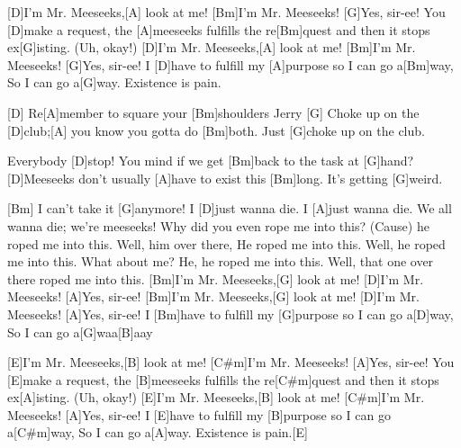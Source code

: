 

\begin{guitar}
	[D]I'm Mr. Meeseeks,[A] look at me! [Bm]I'm Mr. Meeseeks! [G]Yes, sir-ee!
	You [D]make a request, the [A]meeseeks fulfills the re[Bm]quest and then it stops ex[G]isting. (Uh, okay!)
	[D]I'm Mr. Meeseeks,[A] look at me! [Bm]I'm Mr. Meeseeks! [G]Yes, sir-ee!
	I [D]have to fulfill my [A]purpose so I can go a[Bm]way,
	So I can go a[G]way. Existence is pain.
	
	[D] Re[A]member to square your [Bm]shoulders Jerry [G]{}
	Choke up on the [D]club;[A] you know you gotta do [Bm]both. Just [G]choke up on the club.
	
	 
	
	Everybody [D]stop! You mind if we get [Bm]back to the task at [G]hand? 
	[D]Meeseeks don't usually [A]have to exist this [Bm]long. It's getting [G]weird.
	
	 
	
	[Bm] I can't take it [G]anymore!
	I [D]just wanna die. I [A]just wanna die.
	We all wanna die; we're meeseeks! 
	Why did you even rope me into this?
	(Cause) he roped me into this. Well, him over there, 
	He roped me into this. Well, he roped me into this. 
	What about me? He, he roped me into this.
	Well, that one over there roped me into this.
	\pagebreak
	[Bm]I'm Mr. Meeseeks,[G] look at me! [D]I'm Mr. Meeseeks! [A]Yes, sir-ee!
	[Bm]I'm Mr. Meeseeks,[G] look at me! [D]I'm Mr. Meeseeks! [A]Yes, sir-ee!
	I [Bm]have to fulfill my [G]purpose so I can go a[D]way,
	So I can go a[G]waa[B]aay
	
	[E]I'm Mr. Meeseeks,[B] look at me! [C#m]I'm Mr. Meeseeks! [A]Yes, sir-ee!
	You [E]make a request, the [B]meeseeks fulfills the re[C#m]quest and then it stops ex[A]isting. (Uh, okay!)
	[E]I'm Mr. Meeseeks,[B] look at me! [C#m]I'm Mr. Meeseeks! [A]Yes, sir-ee!
	I [E]have to fulfill my [B]purpose so I can go a[C#m]way,
	So I can go a[A]way. Existence is pain.[E]{}
\end{guitar}